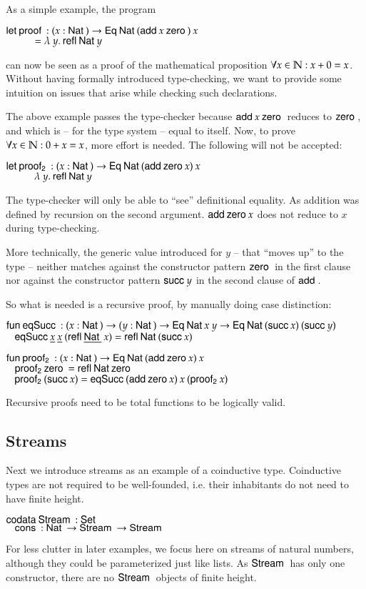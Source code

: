 \noindent As a simple example, the program
\begin{bsp}
$ \mathsf{let}\: \mathsf{proof}\: : ( x : \mathsf{Nat}\: ) \rightarrow{\mathsf{Eq}\:\mathsf{Nat}\:(\mathsf{add}\:x \: \mathsf{zero}\:)\: x} $ \\ 
$ \spcx = \lam{y}\refl \Nat y$ 
\end{bsp}
can now be seen as a proof of the mathematical proposition $ \forall x \in \mathbb{N} : x  + 0 = x $. Without having formally introduced type-checking, we want to provide some intuition on issues that arise while checking such declarations.

The above example passes the type-checker because $\mathsf{add}\: x \: \mathsf{zero}\:$ reduces to $\mathsf{zero}\:$, and which is -- for the type system -- equal to itself. 
Now, to prove $ \forall x \in \mathbb{N} : 0 +  x = x $, more effort is needed.
The following will not be accepted:
\begin{bsp}
$ \mathsf{let}\: \mathsf{proof_2}\: : ( x : \mathsf{Nat}\: ) \rightarrow{\mathsf{Eq}\:\mathsf{Nat}\:(\mathsf{add}\:\mathsf{zero}\:x) \: x} $ \\ 
$ \spcx \lam{y} \refl \Nat y$ 
\end{bsp}
The type-checker will only be able to ``see'' definitional equality.
As addition was defined by recursion on the second argument. $\mathsf{add}\: \mathsf{zero}\: x$ does not reduce to $x$ during type-checking.

More technically, the generic value introduced for $y$ -- that ``moves up'' to the type -- neither matches against the constructor pattern $\mathsf{zero}\:$ in the first clause
nor against the constructor pattern $\mathsf{succ}\: y$ in the second clause of $\mathsf{add}\:$.

So what is needed is a recursive proof, by manually doing case distinction:
\begin{bsp}
$\mathsf{fun}\: \mathsf{eqSucc}\: : ( x : \mathsf{Nat}\: ) \rightarrow( y : \mathsf{Nat}\: ) \rightarrow \mathsf{Eq}\: \mathsf{Nat}\: x \: y \rightarrow \mathsf{Eq}\: \mathsf{Nat}\: (\mathsf{succ}\: x) \: (\mathsf{succ}\: y)$ \\
$\hspace*{3mm} \mathsf{eqSucc}\: \underline{x} \: \underline{x} \: (\mathsf{refl}\: \underline{\mathsf{Nat}\:} \: x) = \mathsf{refl}\: \mathsf{Nat}\: (\mathsf{succ}\: x)$

$\mathsf{fun}\: \mathsf{proof_2}\: : ( x : \mathsf{Nat}\: ) \rightarrow \mathsf{Eq}\: \mathsf{Nat}\: (\mathsf{add}\: \mathsf{zero}\: x) \: x$\\
$\hspace*{3mm} \mathsf{proof_2}\: \mathsf{zero}\: = \mathsf{refl}\: \mathsf{Nat}\: \mathsf{zero}\:$\\
$\hspace*{3mm} \mathsf{proof_2}\: (\mathsf{succ}\: x) = \mathsf{eqSucc}\: (\mathsf{add}\: \mathsf{zero}\: x)\: x \: (\mathsf{proof_2}\: x)$
\end{bsp}
Recursive proofs need to be total functions to be logically valid.

\subsection{Streams}
\label{lstream}
Next we introduce streams as an example of a coinductive type.
Coinductive types are not required to be well-founded, i.e. their inhabitants do not need to have finite height.
\begin{bsp}
$\mathsf{codata}\: \mathsf{Stream}\: : \mathsf{Set} $ \\
$\hspace*{3mm} \mathsf{cons}\: : \mathsf{Nat}\: \rightarrow \mathsf{Stream}\: \rightarrow \mathsf{Stream}\: $
\end{bsp}
For less clutter in later examples, we focus here on streams of natural numbers, although they could be parameterized just like lists.
As $\mathsf{Stream}\:$ has only one constructor, there are no $\mathsf{Stream}\:$ objects of finite height.

